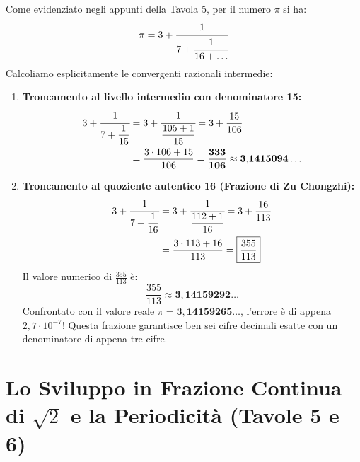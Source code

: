 \documentclass[11pt,a4paper,oneside]{report}
\begin{document}
\begin{laboratorio}
Come evidenziato negli appunti della Tavola 5, per il numero $\pi$ si ha:
\begin{equation}
    \pi = 3 + \cfrac{1}{7 + \cfrac{1}{16 + \dots}}
\end{equation}
Calcoliamo esplicitamente le convergenti razionali intermedie:
\begin{enumerate}[leftmargin=2em]
    \item \textbf{Troncamento al livello intermedio con denominatore 15:}
    \begin{equation}
    \begin{aligned}
        3 + \cfrac{1}{7 + \dfrac{1}{15}} &= 3 + \cfrac{1}{\dfrac{105 + 1}{15}} = 3 + \frac{15}{106} \\
        &= \frac{3 \cdot 106 + 15}{106} = \mathbf{\frac{333}{106}} \approx \mathbf{3{,}1415094\dots}
    \end{aligned}
    \end{equation}
    
    \item \textbf{Troncamento al quoziente autentico 16 (Frazione di Zu Chongzhi):}
    \begin{equation}
    \begin{aligned}
        3 + \cfrac{1}{7 + \dfrac{1}{16}} &= 3 + \cfrac{1}{\dfrac{112 + 1}{16}} = 3 + \frac{16}{113} \\
        &= \frac{3 \cdot 113 + 16}{113} = \mathbf{\boxed{\frac{355}{113}}}
    \end{aligned}
    \end{equation}
    Il valore numerico di $\frac{355}{113}$ \`e:
    \begin{equation}
        \frac{355}{113} \approx \mathbf{3{,}14159292\dots}
    \end{equation}
    Confrontato con il valore reale $\pi = \mathbf{3{,}14159265\dots}$, l'errore \`e di appena $2{,}7 \cdot 10^{-7}$! Questa frazione garantisce ben sei cifre decimali esatte con un denominatore di appena tre cifre.
\end{enumerate}
\end{laboratorio}

\section{Lo Sviluppo in Frazione Continua di \texorpdfstring{$\sqrt{2}$}{sqrt(2)} e la Periodicit\`a (Tavole 5 e 6)}
\end{document}
